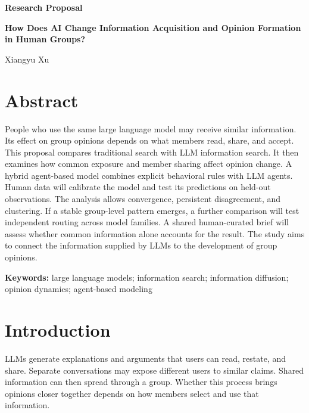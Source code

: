 \documentclass[11pt,a4paper]{article}
\begin{document}
\begin{titlepage}
\centering
\vspace*{2.5cm}
{\sffamily\bfseries\color{navy}\LARGE Research Proposal\par}
\vspace{1.2cm}
{\sffamily\bfseries\Huge How Does AI Change Information Acquisition and Opinion Formation in Human Groups?\par}
\vspace{1.5cm}
{\sffamily\Large Xiangyu Xu\par}
\vspace{0.8cm}

\vfill
\end{titlepage}

\section*{Abstract}

People who use the same large language model may receive similar information. Its effect on group opinions depends on what members read, share, and accept. This proposal compares traditional search with LLM information search. It then examines how common exposure and member sharing affect opinion change. A hybrid agent-based model combines explicit behavioral rules with LLM agents. Human data will calibrate the model and test its predictions on held-out observations. The analysis allows convergence, persistent disagreement, and clustering. If a stable group-level pattern emerges, a further comparison will test independent routing across model families. A shared human-curated brief will assess whether common information alone accounts for the result. The study aims to connect the information supplied by LLMs to the development of group opinions.

\textbf{Keywords:} large language models; information search; information diffusion; opinion dynamics; agent-based modeling

\section{Introduction}

LLMs generate explanations and arguments that users can read, restate, and share. Separate conversations may expose different users to similar claims. Shared information can then spread through a group. Whether this process brings opinions closer together depends on how members select and use that information.
\end{document}
